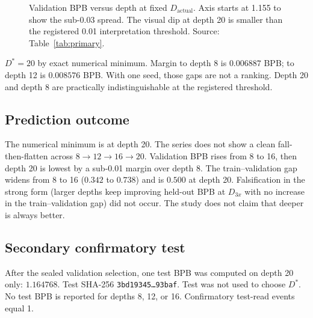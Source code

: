 \documentclass[11pt,a4paper]{article}
\begin{document}
\begin{figure}[t]
\centering
{}
\caption{Validation BPB versus depth at fixed $D_{\mathrm{actual}}$. Axis starts at 1.155 to show the sub-0.03 spread. The visual dip at depth 20 is smaller than the registered 0.01 interpretation threshold. Source: Table~\ref{tab:primary}.}
\label{fig:valbpb}
\end{figure}

$D^{\ast}=20$ by exact numerical minimum. Margin to depth 8 is $0.006887$ BPB; to depth 12 is $0.008576$ BPB. With one seed, those gaps are not a ranking. Depth 20 and depth 8 are practically indistinguishable at the registered threshold.

\subsection{Prediction outcome}
The numerical minimum is at depth 20. The series does not show a clean fall-then-flatten across $8\rightarrow 12\rightarrow 16\rightarrow 20$. Validation BPB rises from 8 to 16, then depth 20 is lowest by a sub-0.01 margin over depth 8. The train--validation gap widens from 8 to 16 ($0.342$ to $0.738$) and is $0.500$ at depth 20. Falsification in the strong form (larger depths keep improving held-out BPB at $D_{3x}$ with no increase in the train--validation gap) did not occur. The study does not claim that deeper is always better.

\subsection{Secondary confirmatory test}
After the sealed validation selection, one test BPB was computed on depth 20 only: $1.164768$. Test SHA-256 \texttt{3bd19345\ldots 93baf}. Test was not used to choose $D^{\ast}$. No test BPB is reported for depths 8, 12, or 16. Confirmatory test-read events equal 1.
\end{document}
